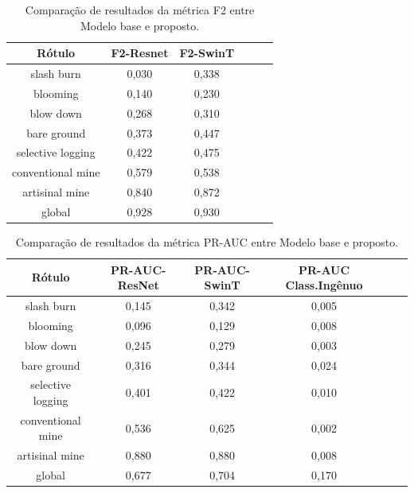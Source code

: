 \begin{table}[h!]
    \caption{ Comparação de resultados da métrica F2 entre Modelo base e proposto.}
    \centering
\begin{tabular}{*{6}{c}}
    \toprule
    Rótulo &F2-Resnet&F2-SwinT \\
    \midrule
            slash burn &  0,030 &  0,338 \\ 
              blooming &  0,140 &  0,230 \\
             blow down &  0,268 &  0,310 \\
           bare ground &  0,373 &  0,447 \\
     selective logging &  0,422 &  0,475 \\
     conventional mine &  0,579 &  0,538 \\
        artisinal mine &  0,840 &  0,872 \\
                global &  0,928 &  0,930 \\
    \bottomrule
\end{tabular}
\label{table:ResultadosSwinT-F2}
\end{table}



\begin{table}[h!]
    \caption{ Comparação de resultados da métrica PR-AUC entre Modelo base e proposto.}
    \centering
\begin{tabular}{*{6}{c}}
    \toprule
    Rótulo &PR-AUC-ResNet&PR-AUC-SwinT&PR-AUC Class.Ingênuo \\
    \midrule
            slash burn &       0,145 &      0,342 &     0,005 \\
              blooming &       0,096 &      0,129 &     0,008 \\
             blow down &       0,245 &      0,279 &     0,003 \\
           bare ground &       0,316 &      0,344 &     0,024 \\
     selective logging &       0,401 &      0,422 &     0,010 \\
     conventional mine &       0,536 &      0,625 &     0,002 \\
        artisinal mine &       0,880 &      0,880 &     0,008 \\
                global &       0,677 &      0,704 &     0,170 \\
    \bottomrule
\end{tabular}
\label{table:ResultadosSwinT-PR-AUC }
\end{table}


